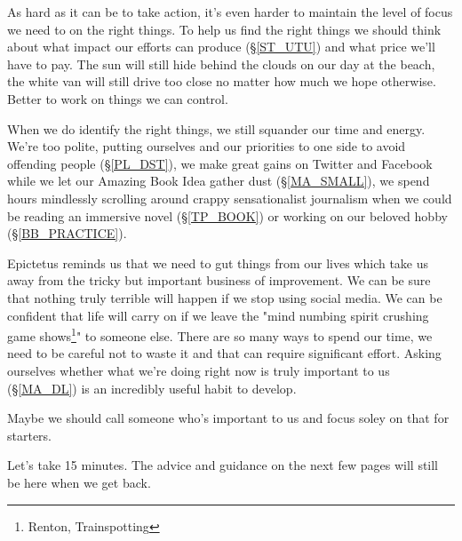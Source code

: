 \cleardoublepage
{\small

As hard as it can be to take action, it's even harder to maintain the level of focus we need to on the right things. To help us find the right things we should think about what impact our efforts can produce (\S \ref{ST_UTU}) and what price we'll have to pay. The sun will still hide behind the clouds on our day at the beach, the white van will still drive too close no matter how much we hope otherwise. Better to work on things we can control.  %

When we do identify the right things, we still squander our time and energy. We're too polite, putting ourselves and our priorities to one side to avoid offending people (\S \ref{PL_DST}), we make great gains on Twitter and Facebook while we let our Amazing Book Idea gather dust (\S \ref{MA_SMALL}), we spend hours mindlessly scrolling around crappy sensationalist journalism when we could be reading an immersive novel (\S \ref{TP_BOOK}) or working on our beloved hobby (\S \ref{BB_PRACTICE}). 

Epictetus reminds us that we need to gut things from our lives which take us away from the tricky but important business of improvement. We can be sure that nothing truly terrible will happen if we stop using social media. We can be confident that life will carry on if we leave the "mind numbing spirit crushing game shows\footnote{Renton, Trainspotting}" to someone else. There are so many ways to spend our time, we need to be careful not to waste it and that can require significant effort. Asking ourselves whether what we're doing right now is truly important to us (\S \ref{MA_DL}) is an incredibly useful habit to develop.

Maybe we should call someone who's important to us and focus soley on that for starters. 

Let's take 15 minutes. The advice and guidance on the next few pages will still be here when we get back. 

}
